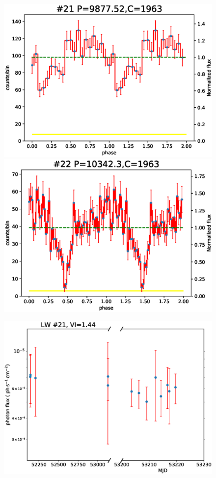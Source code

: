 \documentclass[fleqn,usenatbib]{mnras}
\begin{document}
\begin{figure}
\begin{minipage}[b]{0.45\textwidth}
\includegraphics[width=\textwidth]{./figure/LW/pfold_lc_153001.eps}
\includegraphics[width=\textwidth]{./figure/LW/pfold_lc_153002.eps}
\end{minipage}
\begin{minipage}[b]{0.44\textwidth}
\includegraphics[width=\textwidth]{./figure/LW/153001_lc.eps}

\end{minipage}
\end{figure}
\end{document}
